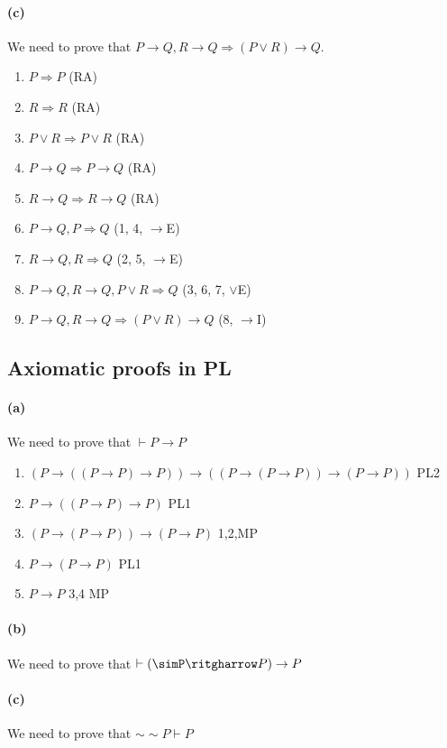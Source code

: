 \documentclass[sloppy, journal, git, bytitle]{humapap}
\begin{document}
\paragraph{(c)} We need to prove that $P\rightarrow Q, R\rightarrow Q \Rightarrow (P\vee R)\rightarrow Q$. 
\begin{enumerate}
	\item $P\Rightarrow P$ \hfil (RA)
	\item $R\Rightarrow R$ \hfil (RA)
	\item $P\vee R\Rightarrow P\vee R$ \hfil (RA)
	\item $P\rightarrow Q\Rightarrow P\rightarrow Q$ \hfil (RA)
	\item $R\rightarrow Q\Rightarrow R\rightarrow Q$ \hfil (RA)
	\item $P\rightarrow Q, P \Rightarrow Q$ \hfil (1, 4, $\rightarrow$E)
	\item $R\rightarrow Q, R \Rightarrow Q$ \hfil (2, 5, $\rightarrow$E)
	\item $P\rightarrow Q, R\rightarrow Q, P\vee R\Rightarrow Q$ \hfil (3, 6, 7, $\vee$E)
	\item $P\rightarrow Q, R\rightarrow Q\Rightarrow (P\vee R)\rightarrow Q$ \hfil (8, $\rightarrow$I)
\end{enumerate}

\subsection{Axiomatic proofs in PL}
\paragraph{(a)} We need to prove that $\vdash P\rightarrow P$
\begin{enumerate}
	\item $(P\rightarrow((P\rightarrow P)\rightarrow P))\rightarrow ((P\rightarrow(P\rightarrow P))\rightarrow(P\rightarrow P))$ \hfil PL2
	\item $P\rightarrow ((P\rightarrow P)\rightarrow P)$ \hfil PL1
	\item $(P\rightarrow (P\rightarrow P))\rightarrow(P\rightarrow P)$ \hfil 1,2,MP
	\item $P\rightarrow (P\rightarrow P)$ \hfil PL1
	\item $P\rightarrow P$ \hfil 3,4 MP
\end{enumerate}


\paragraph{(b)} We need to prove that $\vdash(\simP\ritgharrow P)\rightarrow P$
\paragraph{(c)} We need to prove that $\sim\sim P\vdash P$

\standardbib
\end{document}
